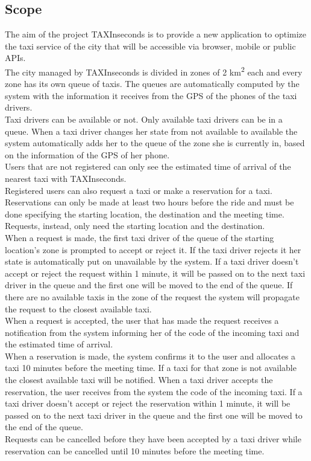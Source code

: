 \documentclass{article}
\begin{document}
\subsection{Scope}
The aim of the project TAXInseconds is to provide a new application to optimize the taxi service of the city that will be accessible via browser, mobile or public APIs.
\\The city managed by TAXInseconds is divided in zones of 2 km\textsuperscript{2} each and every zone has its own queue of taxis. The queues are automatically computed by the system with the information it receives from the GPS of the phones of the taxi drivers.
\\Taxi drivers can be available or not. Only available taxi drivers can be in a queue. When a taxi driver changes her state from not available to available the system automatically adds her to the queue of the zone she is currently in, based on the information of the GPS of her phone. 
\\Users that are not registered can only see the estimated time of arrival of the nearest taxi with TAXInseconds.\@
\\Registered users can also request a taxi or make a reservation for a taxi. Reservations can only be made at least two hours before the ride and must be done specifying the starting location, the destination and the meeting time. Requests, instead, only need the starting location and the destination.
\\When a request is made, the first taxi driver of the queue of the starting location's zone is prompted to accept or reject it. If the taxi driver rejects it her state is automatically put on unavailable by the system. If a taxi driver doesn't accept or reject the request within 1 minute, it will be passed on to the next taxi driver in the queue and the first one will be moved to the end of the queue. If there are no available taxis in the zone of the request the system will propagate the request to the closest available taxi.
\\When a request is accepted, the user that has made the request receives a notification from the system informing her of the code of the incoming taxi and the estimated time of arrival.
\\When a reservation is made, the system confirms it to the user and allocates a taxi 10 minutes before the meeting time. If a taxi for that zone is not available the closest available taxi will be notified. When a taxi driver accepts the reservation, the user receives from the system the code of the incoming taxi. If a taxi driver doesn't accept or reject the reservation within 1 minute, it will be passed on to the next taxi driver in the queue and the first one will be moved to the end of the queue.
\\Requests can be cancelled before they have been accepted by a taxi driver while reservation can be cancelled until 10 minutes before the meeting time.
\end{document}
